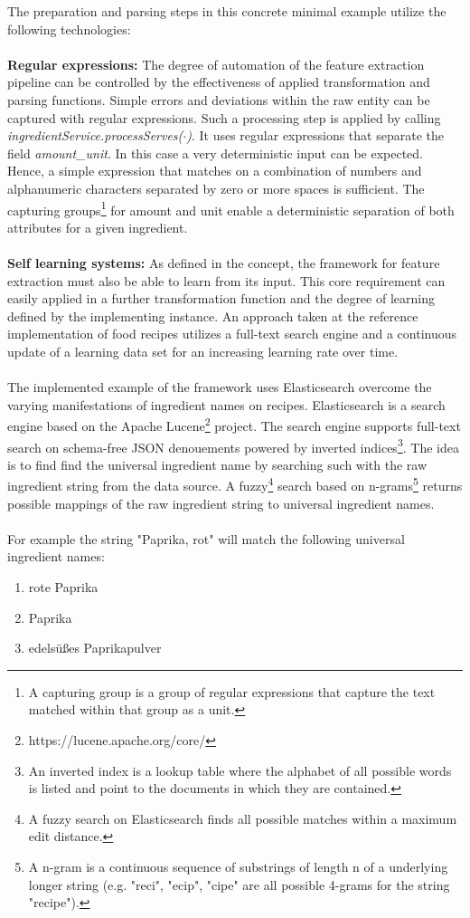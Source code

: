 \noindent The preparation and parsing steps in this concrete minimal example utilize the following technologies:
\\\\
\textbf{Regular expressions:}
The degree of automation of the feature extraction pipeline can be controlled by the effectiveness of applied transformation and parsing functions. Simple errors and deviations within the raw entity can be captured with regular expressions. Such a processing step is applied by calling \textit{ingredientService.processServes($\cdot$)}. It uses regular expressions that separate the field \textit{amount\_unit}. In this case a very deterministic input can be expected. Hence, a simple expression that matches on a combination of numbers and alphanumeric characters separated by zero or more spaces is sufficient. The capturing groups\footnote{A capturing group is a group of regular expressions that capture the text matched within that group as a unit.} for amount and unit enable a deterministic separation of both attributes for a given ingredient.
\\\\
\textbf{Self learning systems:}
As defined in the concept, the framework for feature extraction must also be able to learn from its input. This core requirement can easily applied in a further transformation function and the degree of learning defined by the implementing instance. An approach taken at the reference implementation of food recipes utilizes a full-text search engine and a continuous update of a learning data set for an increasing learning rate over time. 
\\\\
The implemented example of the framework uses Elasticsearch\cite{elasticsearch_2017} overcome the varying manifestations of ingredient names on recipes. Elasticsearch is a search engine based on the Apache Lucene\footnote{https://lucene.apache.org/core/} project. The search engine supports full-text search on schema-free JSON denouements powered by inverted indices\footnote{An inverted index is a lookup table where the alphabet of all possible words is listed and point to the documents in which they are contained.}. The idea is to find find the universal ingredient name by searching such with the raw ingredient string from the data source. A fuzzy\footnote{A fuzzy search on Elasticsearch finds all possible matches within a maximum edit distance.} search based on n-grams\footnote{A n-gram is a continuous sequence of substrings of length n of a underlying longer string (e.g. "reci", "ecip", "cipe" are all possible 4-grams for the string "recipe").} returns possible mappings of the raw ingredient string to universal ingredient names. 
\\\\
For example the string "Paprika, rot" will match the following universal ingredient names:
\begin{enumerate}
\item rote Paprika
\item Paprika
\item edelsüßes Paprikapulver
\end{enumerate}

